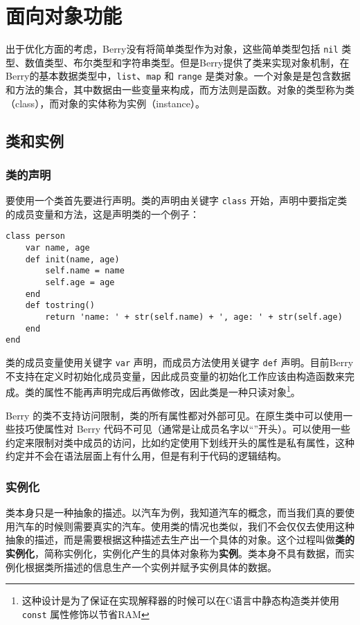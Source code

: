 \chapter{面向对象功能}

出于优化方面的考虑，Berry没有将简单类型作为对象，这些简单类型包括 \texttt{nil} 类型、数值类型、布尔类型和字符串类型。但是Berry提供了类来实现对象机制，在Berry的基本数据类型中，\texttt{list}、\texttt{map} 和 \texttt{range} 是类对象。一个对象是是包含数据和方法的集合，其中数据由一些变量来构成，而方法则是函数。对象的类型称为类（class），而对象的实体称为实例（instance）。

\section{类和实例}

\subsection{类的声明}

要使用一个类首先要进行声明。类的声明由关键字 \texttt{class} 开始，声明中要指定类的成员变量和方法，这是声明类的一个例子：
\begin{lstlisting}[language=berry, numbers=none]
class person
    var name, age
    def init(name, age)
        self.name = name
        self.age = age
    end
    def tostring()
        return 'name: ' + str(self.name) + ', age: ' + str(self.age)
    end
end
\end{lstlisting}

类的成员变量使用关键字 \texttt{var} 声明，而成员方法使用关键字 \texttt{def} 声明。目前Berry不支持在定义时初始化成员变量，因此成员变量的初始化工作应该由构造函数来完成。类的属性不能再声明完成后再做修改，因此类是一种只读对象\footnote{这种设计是为了保证在实现解释器的时候可以在C语言中静态构造类并使用 \texttt{const} 属性修饰以节省RAM}。

Berry 的类不支持访问限制，类的所有属性都对外部可见。在原生类中可以使用一些技巧使属性对 Berry 代码不可见（通常是让成员名字以``''开头）。可以使用一些约定来限制对类中成员的访问，比如约定使用下划线开头的属性是私有属性，这种约定并不会在语法层面上有什么用，但是有利于代码的逻辑结构。

\subsection{实例化}

类本身只是一种抽象的描述。以汽车为例，我知道汽车的概念，而当我们真的要使用汽车的时候则需要真实的汽车。使用类的情况也类似，我们不会仅仅去使用这种抽象的描述，而是需要根据这种描述去生产出一个具体的对象。这个过程叫做\textbf{类的实例化}，简称实例化，实例化产生的具体对象称为\textbf{实例}。类本身不具有数据，而实例化根据类所描述的信息生产一个实例并赋予实例具体的数据。

